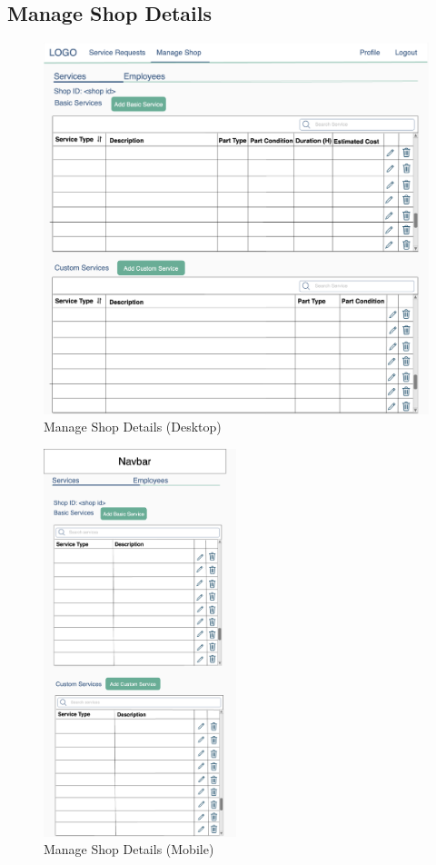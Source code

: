 \documentclass[12pt, titlepage]{article}
\begin{document}
\subsection{Manage Shop Details}

\begin{figure}[H]
	\centering
	\includegraphics[width=\textwidth]{mockups/Manage Shop (Shop Settings) (Desktop).png}
	\caption{Manage Shop \textemdash{} Details (Desktop)}
\end{figure}

\begin{figure}[H]
	\centering
	\includegraphics[width=0.5\textwidth]{mockups/Manage Shop (Shop Settings) (Mobile).png}
	\caption{Manage Shop \textemdash{} Details (Mobile)}
\end{figure}
\end{document}

